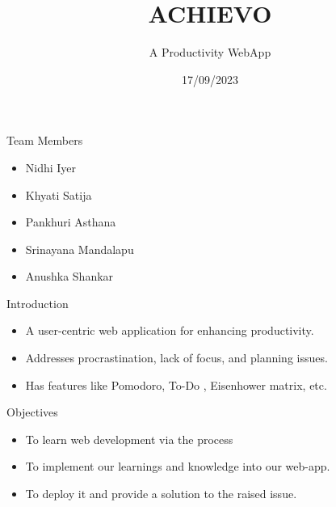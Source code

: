 \documentclass{beamer}
\title{ACHIEVO}
\subtitle{A Productivity WebApp}
\institute[Program]{
        \inst{Women Engineers}
        \inst{TalentSprint}
}
\date{17/09/2023}
\begin{document}
\begin{frame}
  \maketitle
\end{frame}

\begin{frame}{Team Members}
    \begin{itemize}
        \item Nidhi Iyer
        \item Khyati Satija
        \item Pankhuri Asthana
        \item Srinayana Mandalapu
        \item Anushka Shankar
    \end{itemize}
\end{frame}

\begin{frame}{Introduction}
    \begin{itemize}
        \item A user-centric web application for enhancing productivity.
        \item Addresses procrastination, lack of focus, and planning issues.
        \item Has features like Pomodoro, To-Do , Eisenhower matrix, etc.
    \end{itemize}
\end{frame}

\begin{frame}{Objectives}
    \begin{itemize}
        \item To learn web development via the process
        \item To implement our learnings and knowledge into our web-app.
        \item To deploy it and provide a solution to the raised issue.
    \end{itemize}
\end{frame}

\end{document}
